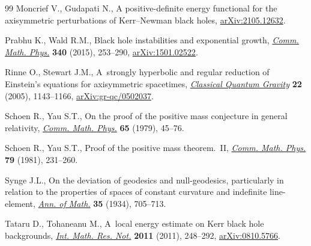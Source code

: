 \documentclass[11pt]{article}
\numberwithin{equation}{section}
\numberwithin{equation}{section}
\begin{document}
\begin{thebibliography}{99}
Moncrief V., Gudapati N., A positive-definite energy functional for the
 axisymmetric perturbations of {K}err--{N}ewman black holes,
 \href{http://arxiv.org/abs/2105.12632}{arXiv:2105.12632}.

Prabhu K., Wald R.M., Black hole instabilities and exponential growth,
 \href{https://doi.org/10.1007/s00220-015-2446-1}{\textit{Comm. Math. Phys.}}
 \textbf{340} (2015), 253--290,
 \href{http://arxiv.org/abs/1501.02522}{arXiv:1501.02522}.

Rinne O., Stewart J.M., A~strongly hyperbolic and regular reduction of
 {E}instein's equations for axisymmetric spacetimes,
 \href{https://doi.org/10.1088/0264-9381/22/6/015}{\textit{Classical Quantum
 Gravity}} \textbf{22} (2005), 1143--1166,
 \href{http://arxiv.org/abs/gr-qc/0502037}{arXiv:gr-qc/0502037}.

Schoen R., Yau S.T., On the proof of the positive mass conjecture in general
 relativity, \href{https://doi.org/10.1007/BF01940959}{\textit{Comm. Math.
 Phys.}} \textbf{65} (1979), 45--76.

Schoen R., Yau S.T., Proof of the positive mass theorem.~{II},
 \href{https://doi.org/10.1007/BF01942062}{\textit{Comm. Math. Phys.}}
 \textbf{79} (1981), 231--260.

Synge J.L., On the deviation of geodesics and null-geodesics, particularly in
 relation to the properties of spaces of constant curvature and indefinite
 line-element, \href{https://doi.org/10.2307/1968486}{\textit{Ann. of Math.}}
 \textbf{35} (1934), 705--713.

Tataru D., Tohaneanu M., A~local energy estimate on {K}err black hole
 backgrounds, \href{https://doi.org/10.1093/imrn/rnq069}{\textit{Int. Math.
 Res. Not.}} \textbf{2011} (2011), 248--292,
 \href{http://arxiv.org/abs/0810.5766}{arXiv:0810.5766}.

\end{thebibliography}
\end{document}

